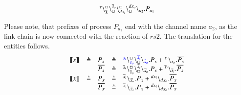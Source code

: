\begin{example}
\[\begin{array}{lcl}
\startchain{\silent}\chainedlink{\overline{s}_i}{\noact}\chainedlink{\noact}{\overline{s}_o}    \chainedlink{dx_i}{\noact}\chainedlink{\noact}{dx_o}\chainend{a_2}.P_{a_1}\\
%
\end{array}
\]

\noindent
Please note, that prefixes of process $P_{a_1}$ end with the channel name $a_2$, as the link chain is now connected with the  reaction of  $rs2$.
The translation for the entities follows.
\[
\begin{array}{lclcl}
\llbracket s \rrbracket &\defeq &P_{s} &\defeq & \startchain{{\color{blue}s_i}}\chainedlink{{\color{blue}s_o}}{\noact}\chainedlink{\noact}{{\color{blue}\widehat{s}_i}}\chainend{{\color{blue}\widehat{s}_o}}.P_{s} + \startchain{s_i}\chainend{s_o}.\overline{P_{s}}\\
&& \overline{P_{s}}&\defeq &\startchain{\overline{s}_i}\chainedlink{\overline{s}_o}{\noact}\chainedlink{\noact}{\widehat{s}_i}\chainend{\widehat{s}_o}.P_{s}+\startchain{\overline{s}_i}\chainend{\overline{s}_i}.\overline{P_{s}}\\
\llbracket x \rrbracket &\defeq & P_{x}& \defeq &\startchain{\widetilde{x}_i}\chainend{\widetilde{x}_o}.P_{x} +  \startchain{dx_i}\chainend{dx_o}.\overline{P_{x}}\\
&& \overline{P_{x}}&\defeq &\startchain{{\color{gray}\widetilde{x}_i}}\chainend{{\color{gray}\widetilde{x}_o}}.P_{x} +  \startchain{dx_i}\chainend{dx_o}.\overline{P_{x}}\\
%


\end{array}\]
\end{example}
